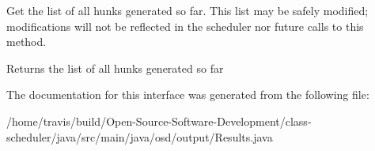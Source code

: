 Get the list of all hunks generated so far. This list may be safely modified; modifications will not be reflected in the scheduler nor future calls to this method. \begin{DoxyReturn}{Returns}
the list of all hunks generated so far 
\end{DoxyReturn}


The documentation for this interface was generated from the following file\-:\begin{DoxyCompactItemize}
\item 
/home/travis/build/\-Open-\/\-Source-\/\-Software-\/\-Development/class-\/scheduler/java/src/main/java/osd/output/Results.\-java\end{DoxyCompactItemize}

